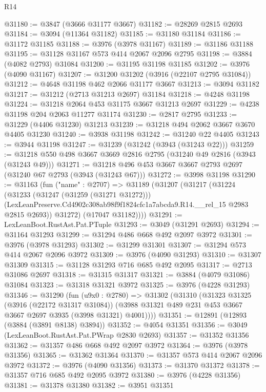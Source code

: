 \begin{lexlean}{R14}
\begin{coremodule}
@31180 := @3847 (@3666 @31177 @3667)
@31182 := @28269 @2815 @2693
@31184 := @3094 (@11364 @31182)
@31185 := @31180 @31184
@31186 := @31172 @31185
@31188 := @3976 (@3978 @31167)
@31189 := @31186 @31188
@31195 := @31128 @31167 @573 @414 @2067 @2096 @2795
@31198 := @3884 (@4082 @2793) @31084
@31200 := @31195 @31198 @31185
@31202 := @3976 (@4090 @31167)
@31207 := @31200 @31202 (@3916 (@22107 @2795 @31084))
@31212 := @4648 @31198 @462 @2066 @31177 @3667
@31213 := @3094 @31182
@31217 := @31212 (@2713 @31213 @2697) @31184
@31218 := @4248 @31198
@31224 := @31218 @2064 @453 @31175 @3667 @31213 @2697
@31229 := @4238 @31198 @204 @2063 @11277 @31174
@31230 := @2817 @2795
@31233 := @31229 (@4406 @31230) @31213
@31239 := @31218 @494 @2062 @3667 @3670 @4405 @31230
@31240 := @3938 @31198
@31242 := @31240 @22 @4405
@31243 := @3944 @31198
@31247 := @31239 (@31242 (@3943 (@31243 @22)))
@31259 := @31218 @550 @498 @3667 @3669 @2816 @2795 (@31240 @49 @2816 (@3943 (@31243 @49)))
@31271 := @31218 @496 @453 @3667 @3667 @2793 @2697 (@31240 @67 @2793 (@3943 (@31243 @67)))
@31272 := @3998 @31198
@31290 := @31163
    (fun ("name" : @2707) =>
    @31189
      (@31207
        (@31217
          (@31224
            (@31233
              (@31247 (@31259 (@31271 @31272)))
              (LexLeanPreserve.Cd4902c308ab98f9f1824cfc1a7abcda9.R14.__rel_15 @2983 @2815 @2693))
            @31272)
          (@17047 @31182))))
@31291 := LexLeanBoot.RustAst.Pat.PTuple
@31293 := @3049 (@31291 @2693)
@31294 := @31164 @31293
@31299 := @31294 @486 @668 @492 @2097 @3972
@31301 := @3976 (@3978 @31293)
@31302 := @31299 @31301
@31307 := @31294 @573 @414 @2067 @2096 @3972
@31309 := @3976 (@4090 @31293)
@31310 := @31307 @31309
@31315 := @31128 @31293 @716 @685 @492 @2095
@31317 := @2713 @31086 @2697
@31318 := @31315 @31317
@31321 := @3884 (@4079 @31086) @31084
@31323 := @31318 @31321 @3972
@31325 := @3976 (@4228 @31293)
@31346 := @31290
    (fun (u9x0 : @2780) =>
    @31302
      (@31310
        (@31323
          @31325
          (@3916 (@22172 @31317 @31084))
          (@3988 @31321 @489 @231 @453 @3667 @3667 @2697 @3935 (@3998 @31321) @4001))))
@31351 := @12891 (@12893 (@3884 (@3891 @8138) @3894))
@31352 := @4054 @31351
@31356 := @3049 (LexLeanBoot.RustAst.Pat.PWrap @2830 @2693)
@31357 := @31352 @31356
@31362 := @31357 @486 @668 @492 @2097 @3972
@31364 := @3976 (@3978 @31356)
@31365 := @31362 @31364
@31370 := @31357 @573 @414 @2067 @2096 @3972
@31372 := @3976 (@4090 @31356)
@31373 := @31370 @31372
@31378 := @31357 @716 @685 @492 @2095 @3972
@31380 := @3976 (@4228 @31356)
@31381 := @31378 @31380
@31382 := @3951 @31351

\end{coremodule}
\end{lexlean}
